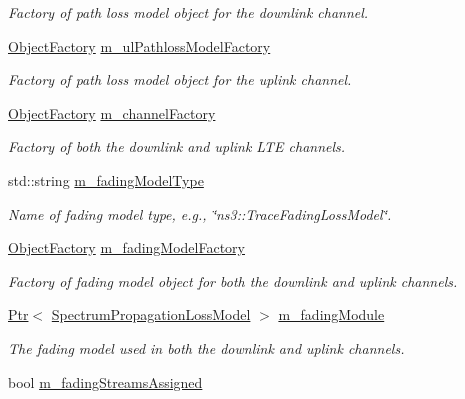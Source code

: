 \begin{DoxyCompactItemize}
\begin{DoxyCompactList}\small\item\em Factory of path loss model object for the downlink channel. \end{DoxyCompactList}\item 
\hyperlink{classns3_1_1ObjectFactory}{Object\+Factory} \hyperlink{classns3_1_1LteHelper_a2743f7987fdd7372b7a976a8488e3827}{m\+\_\+ul\+Pathloss\+Model\+Factory}
\begin{DoxyCompactList}\small\item\em Factory of path loss model object for the uplink channel. \end{DoxyCompactList}\item 
\hyperlink{classns3_1_1ObjectFactory}{Object\+Factory} \hyperlink{classns3_1_1LteHelper_a31d833547d5db8c7a040ce65f328c529}{m\+\_\+channel\+Factory}
\begin{DoxyCompactList}\small\item\em Factory of both the downlink and uplink L\+TE channels. \end{DoxyCompactList}\item 
std\+::string \hyperlink{classns3_1_1LteHelper_a33824762076dc0f25e054347b153f255}{m\+\_\+fading\+Model\+Type}
\begin{DoxyCompactList}\small\item\em Name of fading model type, e.\+g., \char`\"{}ns3\+::\+Trace\+Fading\+Loss\+Model\char`\"{}. \end{DoxyCompactList}\item 
\hyperlink{classns3_1_1ObjectFactory}{Object\+Factory} \hyperlink{classns3_1_1LteHelper_afd0de2f516f15d3a7be64f0ca7e7b7fc}{m\+\_\+fading\+Model\+Factory}
\begin{DoxyCompactList}\small\item\em Factory of fading model object for both the downlink and uplink channels. \end{DoxyCompactList}\item 
\hyperlink{classns3_1_1Ptr}{Ptr}$<$ \hyperlink{classns3_1_1SpectrumPropagationLossModel}{Spectrum\+Propagation\+Loss\+Model} $>$ \hyperlink{classns3_1_1LteHelper_ab986df63e68ba63cb4d2c95bdbf9f47a}{m\+\_\+fading\+Module}
\begin{DoxyCompactList}\small\item\em The fading model used in both the downlink and uplink channels. \end{DoxyCompactList}\item 
bool \hyperlink{classns3_1_1LteHelper_a88e2bb1e3428772135954bf05c17c34e}{m\+\_\+fading\+Streams\+Assigned}

\end{DoxyCompactItemize}
